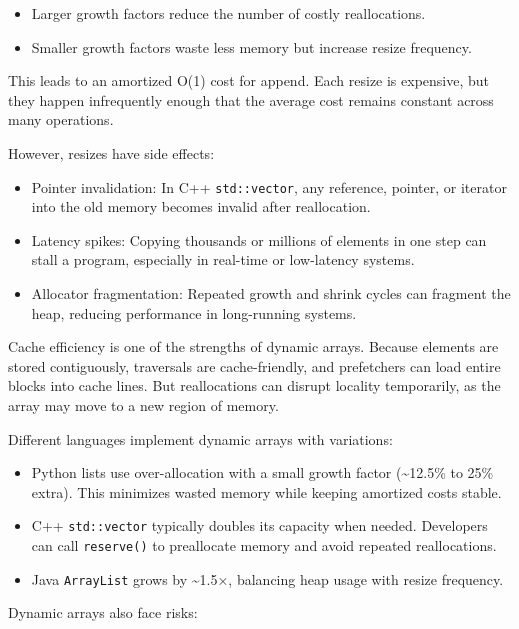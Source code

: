\documentclass[
  letterpaper,
  DIV=11,
  numbers=noendperiod]{scrreprt}
\providecommand{\tightlist}{%
  \setlength{\itemsep}{0pt}\setlength{\parskip}{0pt}}
\begin{document}
\begin{itemize}
\tightlist
\item
  Larger growth factors reduce the number of costly reallocations.
\item
  Smaller growth factors waste less memory but increase resize
  frequency.
\end{itemize}

This leads to an amortized O(1) cost for append. Each resize is
expensive, but they happen infrequently enough that the average cost
remains constant across many operations.

However, resizes have side effects:

\begin{itemize}
\tightlist
\item
  Pointer invalidation: In C++ \texttt{std::vector}, any reference,
  pointer, or iterator into the old memory becomes invalid after
  reallocation.
\item
  Latency spikes: Copying thousands or millions of elements in one step
  can stall a program, especially in real-time or low-latency systems.
\item
  Allocator fragmentation: Repeated growth and shrink cycles can
  fragment the heap, reducing performance in long-running systems.
\end{itemize}

Cache efficiency is one of the strengths of dynamic arrays. Because
elements are stored contiguously, traversals are cache-friendly, and
prefetchers can load entire blocks into cache lines. But reallocations
can disrupt locality temporarily, as the array may move to a new region
of memory.

Different languages implement dynamic arrays with variations:

\begin{itemize}
\tightlist
\item
  Python lists use over-allocation with a small growth factor
  (\textasciitilde12.5\% to 25\% extra). This minimizes wasted memory
  while keeping amortized costs stable.
\item
  C++ \texttt{std::vector} typically doubles its capacity when needed.
  Developers can call \texttt{reserve()} to preallocate memory and avoid
  repeated reallocations.
\item
  Java \texttt{ArrayList} grows by \textasciitilde1.5×, balancing heap
  usage with resize frequency.
\end{itemize}

Dynamic arrays also face risks:
\end{document}
